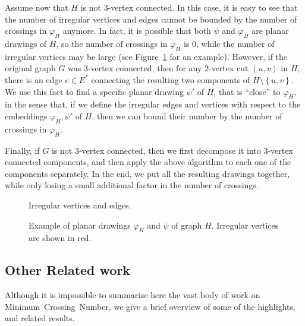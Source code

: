 \documentclass[twoside,leqno,twocolumn]{article}
\newcommand{\set}[1]{\left\{ #1 \right\}}
\renewcommand{\phi}{\varphi}
\newcommand{\MCN}{\mbox{\sf Minimum Crossing Number}\xspace}
\begin{document}
Assume now that $H$ is not $3$-vertex connected. In this case, it is easy to see that the number of irregular vertices and edges cannot be bounded by the number of crossings in $\phi_H$ anymore. In fact, it is possible that both $\psi$ and $\phi_H$ are planar drawings of $H$, so the number of crossings in $\phi_H$ is $0$, while the number of irregular vertices may be large (see Figure~\ref{fig: example2} for an example). However, if the original graph $G$ was $3$-vertex connected, then for any $2$-vertex cut $(u,v)$ in $H$, there is an edge $e\in E^*$ connecting the resulting two components of $H\setminus\set{u,v}$. We use this fact to find a specific planar drawing $\psi'$ of $H$, that is ``close'' to $\phi_H$, in the sense that, if we define the irregular edges and vertices with respect to the embeddings $\phi_H,\psi'$ of $H$, then we can bound their number  by the number of crossings in $\phi_H$.

Finally, if $G$ is not $3$-vertex  connected, then we first decompose it into $3$-vertex connected components, and then apply the above algorithm to each one of the components separately. In the end, we put all the resulting drawings together, while only losing a small additional factor in the number of crossings.


\begin{figure}[h]
\centering
{}
\hspace{2cm}
\caption{Irregular vertices and edges.}
\end{figure}


\begin{figure}[h]
\begin{center}
 \caption{Example of planar drawings $\phi_H$ and $\psi$ of graph $H$. Irregular vertices are shown in red.}\label{fig: example2}
\end{center}
\end{figure}



\subsection{Other Related work}
Although it is impossible to summarize here the vast body of work on \MCN, we give a brief overview of some of the highlights, and related results.
\end{document}
